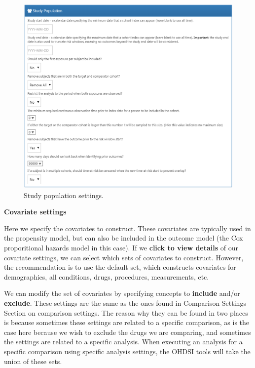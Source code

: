 \documentclass[]{book}
\begin{document}
\begin{figure}

{\centering \includegraphics[width=1\linewidth]{images/PopulationLevelEstimation/studyPopulation} 

}

\caption{Study population settings.}\label{fig:studyPopulation}
\end{figure}

\textbf{Covariate settings}

Here we specify the covariates to construct. These covariates are typically used in the propensity model, but can also be included in the outcome model (the Cox proporitional hazards model in this case). If we \textbf{click to view details} of our covariate settings, we can select which sets of covariates to construct. However, the recommendation is to use the default set, which constructs covariates for demographics, all conditions, drugs, procedures, measurements, etc.

We can modify the set of covariates by specifying concepts to \textbf{include} and/or \textbf{exclude}. These settings are the same as the ones found in Comparison Settings Section on comparison settings. The reason why they can be found in two places is because sometimes these settings are related to a specific comparison, as is the case here because we wish to exclude the drugs we are comparing, and sometimes the settings are related to a specific analysis. When executing an analysis for a specific comparison using specific analysis settings, the OHDSI tools will take the union of these sets.
\end{document}
